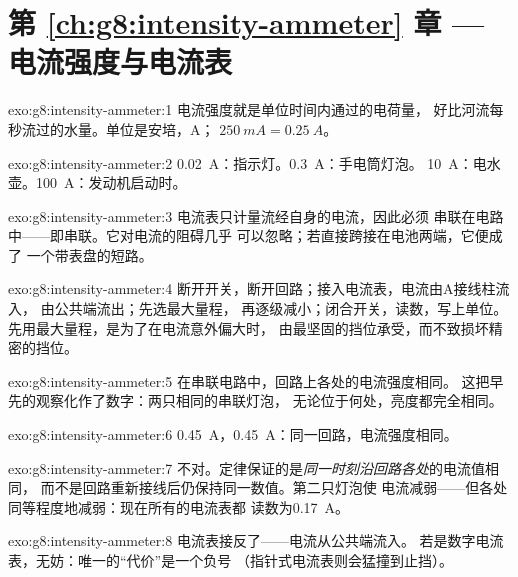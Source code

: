 \section*{第 \ref{ch:g8:intensity-ammeter} 章 --- 电流强度与电流表}

\begin{solution}{exo:g8:intensity-ammeter:1}
电流强度就是单位时间内通过的电荷量，
好比河流每秒流过的水量。单位是安培，\unit{A}；
$\qty{250}{mA} = \qty{0.25}{A}$。
\end{solution}

\begin{solution}{exo:g8:intensity-ammeter:2}
\qty{0.02}{A}：指示灯。\qty{0.3}{A}：手电筒灯泡。
\qty{10}{A}：电水壶。\qty{100}{A}：发动机启动时。
\end{solution}

\begin{solution}{exo:g8:intensity-ammeter:3}
电流表只计量流经自身的电流，因此必须
串联在电路中——即串联。它对电流的阻碍几乎
可以忽略；若直接跨接在电池两端，它便成了
一个带表盘的短路。
\end{solution}

\begin{solution}{exo:g8:intensity-ammeter:4}
断开开关，断开回路；接入电流表，电流由\unit{A}接线柱流入，
由公共端流出；先选最大量程，
再逐级减小；闭合开关，读数，写上单位。
先用最大量程，是为了在电流意外偏大时，
由最坚固的挡位承受，而不致损坏精密的挡位。
\end{solution}

\begin{solution}{exo:g8:intensity-ammeter:5}
在串联电路中，回路上各处的电流强度相同。
这把早先的观察化作了数字：两只相同的串联灯泡，
无论位于何处，亮度都完全相同。
\end{solution}

\begin{solution}{exo:g8:intensity-ammeter:6}
\qty{0.45}{A}，\qty{0.45}{A}：同一回路，电流强度相同。
\end{solution}

\begin{solution}{exo:g8:intensity-ammeter:7}
不对。定律保证的是\emph{同一时刻沿回路各处}的电流值相同，
而不是回路重新接线后仍保持同一数值。第二只灯泡使
电流减弱——但各处同等程度地减弱：现在所有的电流表都
读数为\qty{0.17}{A}。
\end{solution}

\begin{solution}{exo:g8:intensity-ammeter:8}
电流表接反了——电流从公共端流入。
若是数字电流表，无妨：唯一的“代价”是一个负号
（指针式电流表则会猛撞到止挡）。
\end{solution}

